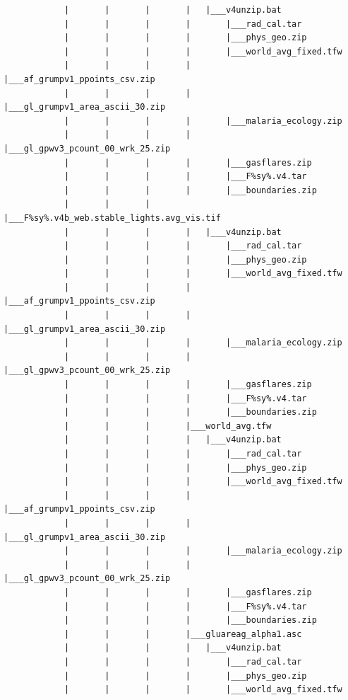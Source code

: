 \documentclass[]{book}
\begin{document}
\begin{verbatim}
            |       |       |       |   |___v4unzip.bat
            |       |       |       |       |___rad_cal.tar
            |       |       |       |       |___phys_geo.zip
            |       |       |       |       |___world_avg_fixed.tfw
            |       |       |       |       |___af_grumpv1_ppoints_csv.zip
            |       |       |       |       |___gl_grumpv1_area_ascii_30.zip
            |       |       |       |       |___malaria_ecology.zip
            |       |       |       |       |___gl_gpwv3_pcount_00_wrk_25.zip
            |       |       |       |       |___gasflares.zip
            |       |       |       |       |___F%sy%.v4.tar
            |       |       |       |       |___boundaries.zip
            |       |       |       |___F%sy%.v4b_web.stable_lights.avg_vis.tif
            |       |       |       |   |___v4unzip.bat
            |       |       |       |       |___rad_cal.tar
            |       |       |       |       |___phys_geo.zip
            |       |       |       |       |___world_avg_fixed.tfw
            |       |       |       |       |___af_grumpv1_ppoints_csv.zip
            |       |       |       |       |___gl_grumpv1_area_ascii_30.zip
            |       |       |       |       |___malaria_ecology.zip
            |       |       |       |       |___gl_gpwv3_pcount_00_wrk_25.zip
            |       |       |       |       |___gasflares.zip
            |       |       |       |       |___F%sy%.v4.tar
            |       |       |       |       |___boundaries.zip
            |       |       |       |___world_avg.tfw
            |       |       |       |   |___v4unzip.bat
            |       |       |       |       |___rad_cal.tar
            |       |       |       |       |___phys_geo.zip
            |       |       |       |       |___world_avg_fixed.tfw
            |       |       |       |       |___af_grumpv1_ppoints_csv.zip
            |       |       |       |       |___gl_grumpv1_area_ascii_30.zip
            |       |       |       |       |___malaria_ecology.zip
            |       |       |       |       |___gl_gpwv3_pcount_00_wrk_25.zip
            |       |       |       |       |___gasflares.zip
            |       |       |       |       |___F%sy%.v4.tar
            |       |       |       |       |___boundaries.zip
            |       |       |       |___gluareag_alpha1.asc
            |       |       |       |   |___v4unzip.bat
            |       |       |       |       |___rad_cal.tar
            |       |       |       |       |___phys_geo.zip
            |       |       |       |       |___world_avg_fixed.tfw

\end{verbatim}
\end{document}
